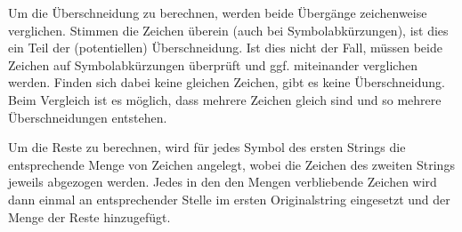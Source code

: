 Um die Überschneidung zu berechnen, werden beide Übergänge zeichenweise verglichen. Stimmen die Zeichen überein (auch bei Symbolabkürzungen), ist dies ein Teil der (potentiellen) Überschneidung. Ist dies nicht der Fall, müssen beide Zeichen auf Symbolabkürzungen überprüft und ggf. miteinander verglichen werden. Finden sich dabei keine gleichen Zeichen, gibt es keine Überschneidung. Beim Vergleich ist es möglich, dass mehrere Zeichen gleich sind und so mehrere Überschneidungen entstehen. %

Um die Reste zu berechnen, wird für jedes Symbol des ersten Strings die entsprechende Menge von Zeichen angelegt, wobei die Zeichen des zweiten Strings jeweils abgezogen werden. Jedes in den den Mengen verbliebende Zeichen wird dann einmal an entsprechender Stelle im ersten Originalstring eingesetzt und der Menge der Reste hinzugefügt.

